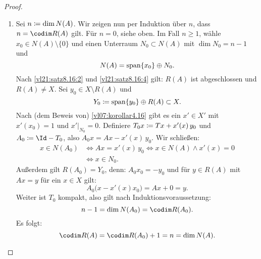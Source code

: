 \begin{proof}
\begin{enumerate}[(1)]
        \item
            Sei $n\coloneqq \dim N(A)$. Wir zeigen nun per Induktion über $n$, dass
            $n = \codim R(A)$ gilt. Für $n=0$, siehe oben. Im Fall $n\geq 1$,
            wähle $x_0\in N(A)\setminus\{0\}$ und einen Unterraum
            $N_0\subset N(A)$ mit $\dim N_0 = n-1$ und
            \[ N(A) = \operatorname{span}\{x_0\} \oplus N_0  . \]
            Nach \ref{vl21:satz8.16:2} und \ref{vl21:satz8.16:4} gilt:
            $R(A)$ ist abgeschlossen und $R(A) \neq X$.
            Sei $y_0\in X\setminus R(A)$ und
            \[ Y_0 \coloneqq \operatorname{span}\{y_0\}\oplus R(A) \subset X  .\]
            Nach (dem Beweis von) \cref{vl07:korollar4.16} gibt es ein
            $x'\in X'$ mit $x'(x_0)=1$ und $x'\vert_{N_0} = 0$. Definiere $T_0x
            \coloneqq Tx + x'(x)\,y_0$ und $A_0 \defeq \Id-T_0$, also $A_0 x = 
            Ax - x'(x)\, y_0$.
            Wir schließen:
            \begin{align*}
                x\in N(A_0)
                &\iff Ax = x'(x)\,y_0
                 \iff x\in N(A) \wedge x'(x) = 0
                \\
                &\iff x\in N_0
            . \end{align*}
            Außerdem gilt $R(A_0) = Y_0$, denn: $A_0x_0=-y_0$
            und für $y\in R(A)$ mit $Ax=y$ für ein $x\in X$ gilt:
            \[ A_0\bigl(x-x'(x)x_0\bigr) 
                = Ax + 0 = y
            . \]
            Weiter ist $T_0$ kompakt, also gilt nach Induktionsvoraussetzung:
            \[ n-1 = \dim N(A_0) = \codim R(A_0)  . \]
            Es folgt:
            \[ \codim R(A) = \codim R(A_0) + 1 = n = \dim N(A)  . \]
            \qedhere
    \end{enumerate}
\end{proof}

